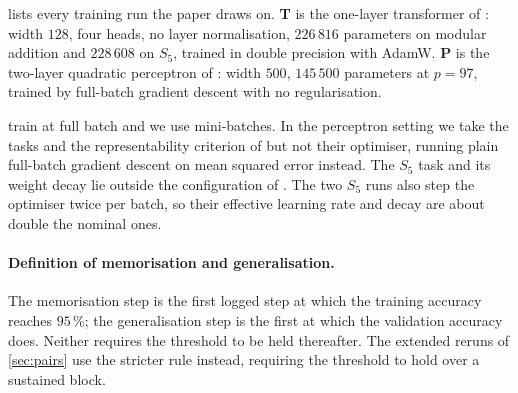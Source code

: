 \documentclass{article}
\begin{document}
 lists every training run the paper draws on. \textbf{T} is the one-layer transformer of \citet{nanda2023progress}: width $128$, four heads, no
layer normalisation, $226\,816$ parameters on modular addition and $228\,608$ on $S_5$, trained
in double precision with AdamW.
\textbf{P} is the two-layer quadratic perceptron of \citet{gromov2023grokking}: width $500$,
$145\,500$ parameters at $p = 97$, trained by full-batch gradient descent with no regularisation.

\citet{nanda2023progress} train at full batch and we use mini-batches. In the perceptron setting we
take the tasks and the representability criterion of \citet{doshi2024grokking} but not their
optimiser, running plain full-batch gradient descent on mean squared error instead. The $S_5$ task
\citep{power2022grokking} and its weight decay lie outside the configuration of
\citet{nanda2023progress}. The two $S_5$ runs also step the optimiser twice per batch, so their
effective learning rate and decay are about double the nominal ones.

\paragraph{Definition of memorisation and generalisation.} The memorisation step is the first
logged step at which the training accuracy reaches $95\,\%$; the generalisation step is the first
at which the validation accuracy does. Neither requires the threshold to be held thereafter. The
extended reruns of \cref{sec:pairs} use the stricter rule instead, requiring the threshold to hold
over a sustained block.
\end{document}
